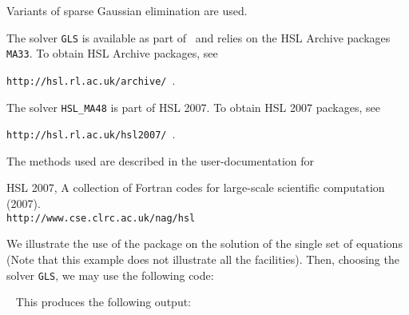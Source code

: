 \documentclass{galahad}
\begin{document}

\galmethod
Variants of sparse Gaussian elimination are used.

\noindent
The solver {\tt GLS} is available as part of \galahad\ and relies on
the HSL Archive packages {\tt MA33}. To obtain HSL Archive packages, see

{\tt http://hsl.rl.ac.uk/archive/ }.

\noindent
The solver {\tt HSL\_MA48}
is part of HSL 2007.
To obtain HSL 2007 packages, see

{\tt http://hsl.rl.ac.uk/hsl2007/ }.



\vspace*{1mm}

\galreferences
\vspace*{1mm}

\noindent
The methods used are described in the user-documentation for
\vspace*{1mm}

\noindent
HSL 2007, A collection of {F}ortran codes for large-scale scientific
 computation (2007). \\
 {\tt http://www.cse.clrc.ac.uk/nag/hsl}





\galexample
We illustrate the use of the package on the solution of the
single set of equations
(Note that this example does not illustrate all the facilities).
Then, choosing the solver {\tt GLS}, we may use the following code:

{\tt \small
\VerbatimInput{\packageexample}
}
\noindent
This produces the following output:
{\tt \small
\VerbatimInput{\packageresults}
}
\noindent
\end{document}
